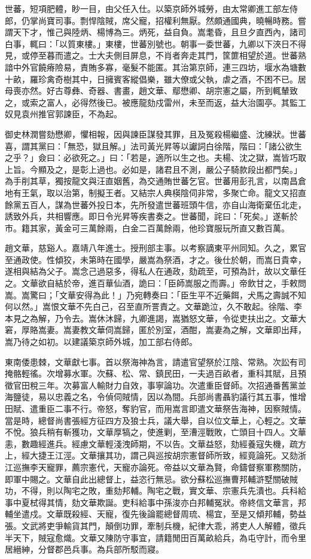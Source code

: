 \begin{pinyinscope}
世蕃，短項肥體，眇一目，由父任入仕。以築京師外城勞，由太常卿進工部左侍郎，仍掌尚寶司事。剽悍陰賊，席父寵，招權利無厭。然頗通國典，曉暢時務。嘗謂天下才，惟己與陸炳、楊博為三。炳死，益自負。嵩耄昏，且旦夕直西內，諸司白事，輒曰：「以質東樓。」東樓，世蕃別號也。朝事一委世蕃，九卿以下浹日不得見，或停至暮而遣之。士大夫側目屏息，不肖者奔走其門，筐篚相望於道。世蕃熟諳中外官饒瘠險易，責賄多寡，毫髮不能匿。其治第京師，連三四坊，堰水為塘數十畝，羅珍禽奇樹其中，日擁賓客縱倡樂，雖大僚或父執，虐之酒，不困不已。居母喪亦然。好古尊彝、奇器、書畫，趙文華、鄢懋卿、胡宗憲之屬，所到輒輦致之，或索之富人，必得然後已。被應龍劾戍雷州，未至而返，益大治園亭。其監工奴見袁州推官郭諫臣，不為起。

御史林潤嘗劾懋卿，懼相報，因與諫臣謀發其罪，且及冤殺楊繼盛、沈練狀。世蕃喜，謂其黨曰：「無恐，獄且解。」法司黃光昇等以讞詞白徐階，階曰：「諸公欲生之乎？」僉曰：必欲死之。」曰：「若是，適所以生之也。夫楊、沈之獄，嵩皆巧取上旨。今顯及之，是彰上過也。必如是，諸君且不測，嚴公子騎款段出都門矣。」為手削其草，獨按龍文與汪直姻舊，為交通賄世蕃乞官。世蕃用彭孔言，以南昌倉地有王氣，取以治第，制擬王者。又結宗人典楧陰伺非常，多聚亡命。龍文又招直餘黨五百人，謀為世蕃外投日本，先所發遣世蕃班頭牛信，亦自山海衛棄伍北走，誘致外兵，共相響應。即日令光昇等疾書奏之。世蕃聞，詫曰：「死矣。」遂斬於市。籍其家，黃金可三萬餘兩，白金二百萬餘兩，他珍寶服玩所直又數百萬。

趙文華，慈谿人。嘉靖八年進士。授刑部主事。以考察謫東平州同知。久之，累官至通政使。性傾狡，未第時在國學，嚴嵩為祭酒，才之。後仕於朝，而嵩日貴幸，遂相與結為父子。嵩念己過惡多，得私人在通政，劾疏至，可預為計，故以文華任之。文華欲自結於帝，進百華仙酒，詭曰：「臣師嵩服之而壽。」帝飲甘之，手敕問嵩。嵩驚曰；「文華安得為此！」乃宛轉奏曰：「臣生平不近藥餌，犬馬之壽誠不知何以然。」嵩恨文華不先白己，召至直所詈責之。文華跪泣，久不敢起。徐階、李本見之為解，乃令去。嵩休沐歸，九卿進謁，嵩猶怒文華，令從吏扶出之。文華大窘，厚賂嵩妻。嵩妻教文華伺嵩歸，匿於別室，酒酣，嵩妻為之解，文華即出拜，嵩乃待之如初。以建議築京師外城，加工部右侍郎。

東南倭患棘，文華獻七事。首以祭海神為言，請遣官望祭於江陰、常熟。次訟有司掩骼輕徭。次增募水軍。次蘇、松、常、鎮民田，一夫過百畝者，重科其賦，且預徵官田稅三年。次募富人輸財力自效，事寧論功。次遣重臣督師。次招通番舊黨並海鹽徒，易以忠義之名，令偵伺賊情，因以為間。兵部尚書聶豹議行其五事，惟增田賦、遣重臣二事不行。帝怒，奪豹官，而用嵩言即遣文華祭告海神，因察賊情。當是時，總督尚書張經方征四方及狼士兵，議大舉，自以位文華上，心輕之。文華不悅。狼兵稍有斬獲功，文華厚犒之，使進剿，至漕涇戰敗，亡頭目十四人。文華恚，數趣經進兵。經慮文華輕淺洩師期，不以告。文華益怒，劾經養寇失機，疏方上，經大捷王江涇。文華攘其功，謂己與巡按胡宗憲督師所致，經竟論死。又劾浙江巡撫李天寵罪，薦宗憲代，天寵亦論死。帝益以文華為賢，命鑄督察軍務關防，即軍中賜之。文華自此出總督上，益恣行無忌。欲分蘇松巡撫曹邦輔滸墅關破賊功，不得，則以陶宅之敗，重劾邦輔。陶宅之戰，實文華、宗憲兵先潰也。兵科給事中夏栻得其情，劾文華欺誕。吏科給事中孫浚亦白邦輔冤狀。帝終信文華言，邦輔坐遣戍。文華既殺經、天寵，復先後論罷總督周琉、楊宜，至是又傾邦輔，勢益張。文武將吏爭輸貨其門，顛倒功罪，牽制兵機，紀律大乖，將吏人人解體，徵兵半天下，賊寇愈熾。文華又陳防守事宜，請籍閒田百萬畝給兵，為屯守計，而令里居縉紳，分督郡邑兵事。為兵部所駁而寢。


\end{pinyinscope}
